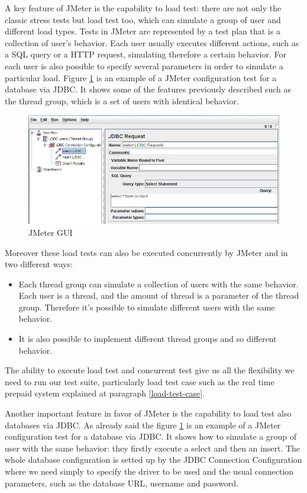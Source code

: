 A key feature of JMeter is the capability to load test: there are not only the classic stress tests but load test too, which can simulate a group of user and different load types. Tests in JMeter are represented by a test plan that is a collection of user's behavior. Each user usually executes different actions, such as a SQL query or a HTTP request, simulating therefore a certain behavior. For each user is also possible to specify several parameters in order to simulate a particular load. Figure \ref{JMeter} is an example of a JMeter configuration test for a database via JDBC. It shows some of the features previously described such as the thread group, which is a set of users with identical behavior. 

\begin{figure}[htp!] 
	\begin{center}
		\includegraphics[width=13cm]{img/JMeterSQL.jpg}	
	\end{center}
	\caption{JMeter GUI}
	\label{JMeter}	
\end{figure}

Moreover these load tests can also be executed concurrently by JMeter and in two different ways:
\begin{itemize}
	\item Each thread group can simulate a collection of users with the same behavior. Each user is a thread, and the amount of thread is a parameter of the thread group. Therefore it's possible to simulate different users with the same behavior.
	\item It is also possible to implement different thread groups and so different behavior.
\end{itemize}
The ability to execute load test and concurrent test give us all the flexibility we need to run our test suite, particularly load test case such as the real time prepaid system explained at paragraph \ref{load-test-case}.

Another important feature in favor of JMeter is the capability to load test also databases via JDBC. As already said the figure \ref{JMeter} is an example of a JMeter configuration test for a database via JDBC. It shows how to simulate a group of user with the same behavior: they firstly execute a select and then an insert. The whole database configuration is setted up by the JDBC Connection Configuration where we need simply to specify the driver to be used and the usual connection parameters, such as the database URL, username and password. 

